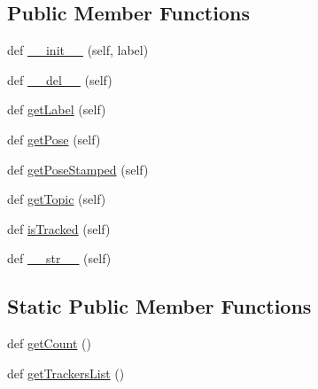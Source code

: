 \subsection*{Public Member Functions}
\begin{DoxyCompactItemize}
\item 
def \mbox{\hyperlink{classwindshape_1_1drone_1_1mocap_1_1_rigid_body_1_1_rigid_body_a2804ab5c7a3a61772342037b39fe4eb0}{\+\_\+\+\_\+init\+\_\+\+\_\+}} (self, label)
\item 
def \mbox{\hyperlink{classwindshape_1_1drone_1_1mocap_1_1_rigid_body_1_1_rigid_body_a24ef689ecd1fdf8f85ca82b1abc442e2}{\+\_\+\+\_\+del\+\_\+\+\_\+}} (self)
\item 
def \mbox{\hyperlink{classwindshape_1_1drone_1_1mocap_1_1_rigid_body_1_1_rigid_body_a79269837a1148c0d9c74fde66d6e4697}{get\+Label}} (self)
\item 
def \mbox{\hyperlink{classwindshape_1_1drone_1_1mocap_1_1_rigid_body_1_1_rigid_body_a253804cb7092d4e5084ba1312dc7219a}{get\+Pose}} (self)
\item 
def \mbox{\hyperlink{classwindshape_1_1drone_1_1mocap_1_1_rigid_body_1_1_rigid_body_ab4db6bb3a66110c7c23370df9eed7a70}{get\+Pose\+Stamped}} (self)
\item 
def \mbox{\hyperlink{classwindshape_1_1drone_1_1mocap_1_1_rigid_body_1_1_rigid_body_a02cbe842fdaffeaa5593a5163f03d65b}{get\+Topic}} (self)
\item 
def \mbox{\hyperlink{classwindshape_1_1drone_1_1mocap_1_1_rigid_body_1_1_rigid_body_ad094c24d63255feeb6280825e7731596}{is\+Tracked}} (self)
\item 
def \mbox{\hyperlink{classwindshape_1_1drone_1_1mocap_1_1_rigid_body_1_1_rigid_body_afdba89fb5adee293cf44812c6887dc1a}{\+\_\+\+\_\+str\+\_\+\+\_\+}} (self)
\end{DoxyCompactItemize}
\subsection*{Static Public Member Functions}
\begin{DoxyCompactItemize}
\item 
def \mbox{\hyperlink{classwindshape_1_1drone_1_1mocap_1_1_rigid_body_1_1_rigid_body_a3aff2207a3be020c656a63240f4c6a42}{get\+Count}} ()
\item 
def \mbox{\hyperlink{classwindshape_1_1drone_1_1mocap_1_1_rigid_body_1_1_rigid_body_ad15429ecf1f62801353af9cdc5f82857}{get\+Trackers\+List}} ()
\end{DoxyCompactItemize}


